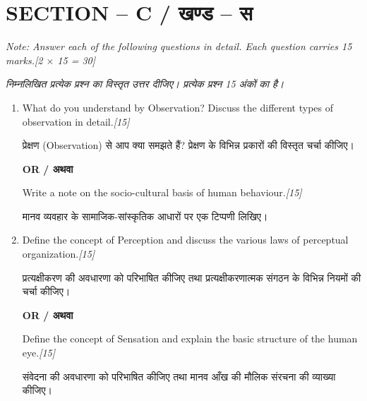 \documentclass[11pt,a4paper]{article}
\newcommand{\pts}[1]{\hfill \textit{[#1]}}
\begin{document}
\bigskip

\section*{SECTION -- C / खण्ड -- स}
\noindent \textit{Note: Answer each of the following questions in detail. Each question carries 15 marks.}\pts{2 $\times$ 15 = 30}

\noindent \textit{निम्नलिखित प्रत्येक प्रश्न का विस्तृत उत्तर दीजिए। प्रत्येक प्रश्न 15 अंकों का है।}

\begin{enumerate}[label=\textbf{\arabic*.},leftmargin=*,start=5,itemsep=14pt]

  \item What do you understand by Observation? Discuss the different types of observation in detail.\pts{15}
  
  प्रेक्षण (Observation) से आप क्या समझते हैं? प्रेक्षण के विभिन्न प्रकारों की विस्तृत चर्चा कीजिए।

  \begin{center}\textbf{OR / अथवा}\end{center}

  Write a note on the socio-cultural basis of human behaviour.\pts{15}
  
  मानव व्यवहार के सामाजिक-सांस्कृतिक आधारों पर एक टिप्पणी लिखिए।

  \item Define the concept of Perception and discuss the various laws of perceptual organization.\pts{15}
  
  प्रत्यक्षीकरण की अवधारणा को परिभाषित कीजिए तथा प्रत्यक्षीकरणात्मक संगठन के विभिन्न नियमों की चर्चा कीजिए।

  \begin{center}\textbf{OR / अथवा}\end{center}

  Define the concept of Sensation and explain the basic structure of the human eye.\pts{15}
  
  संवेदना की अवधारणा को परिभाषित कीजिए तथा मानव आँख की मौलिक संरचना की व्याख्या कीजिए।

\end{enumerate}
\end{document}
